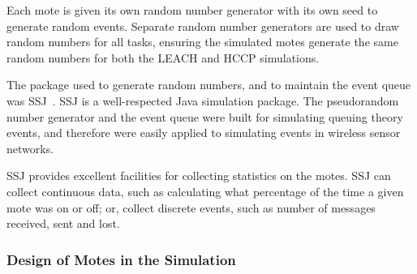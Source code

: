 Each mote is given its own random number generator with its own seed to generate random events. 
Separate random number generators are used to draw random numbers for all tasks, ensuring
the simulated motes generate the same random numbers for both the LEACH and HCCP simulations.

The package used to generate random numbers, and to maintain the event queue was SSJ~\cite{SSJ}. 
SSJ is a well-respected Java simulation package. The pseudorandom number generator and the
event queue were built for simulating queuing theory events, and therefore were easily applied to simulating
events in wireless sensor networks.

SSJ provides excellent facilities for collecting statistics on the motes. SSJ can collect continuous 
data, such as calculating what percentage of the time a given mote was on or off; or, collect discrete
events, such as number of messages received, sent and lost.


\subsubsection{Design of Motes in the Simulation}

